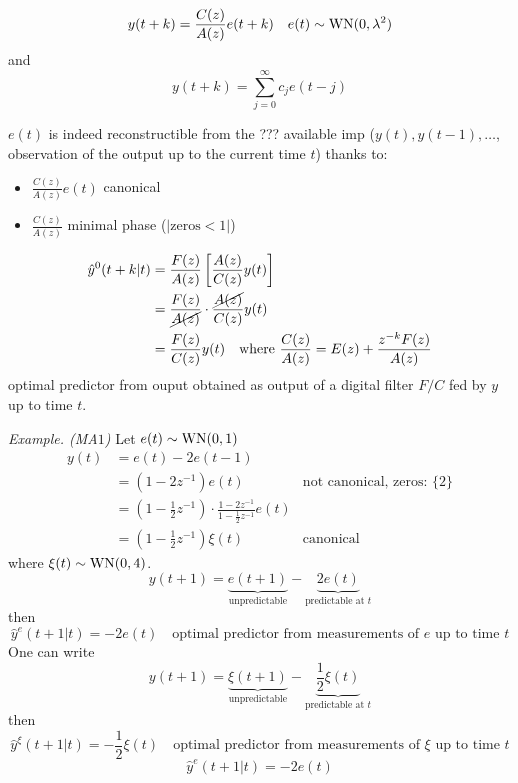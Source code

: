 

\[
	y(t+k)=\frac{C(z)}{A(z)}e(t+k) \quad e(t)\sim\operatorname{WN}(0,\lambda^2 )
\]
and
\[
	y(t+k)=\sum_{j=0}^{\infty} c_{j} e(t-j)
\]



$e(t)$ is indeed reconstructible from the ??? available imp ($y(t), y(t-1),\ldots$, observation of the output up to the current time $t$) thanks to:
\begin{itemize}
	\item $\frac{C(z)}{A(z)}e(t)$ canonical
	\item $\frac{C(z)}{A(z)}$ minimal phase ($|\text{zeros}<1|$)
\end{itemize}


\begin{align*}
	\hat y ^{0}(t+k|t)&=\frac{F(z)}{A(z)}\left[ \frac{A(z)}{C(z)}y(t) \right]  \\
	&=\frac{F(z)}{\cancel{A(z)}}\cdot\frac{\cancel{A(z)}}{C(z)}y(t)\\
	&=\frac{F(z)}{C(z)}y(t) \quad \text{where }\frac{C(z)}{A(z)}=E(z)+\frac{z^{-k}F(z) }{A(z)}
\end{align*}
optimal predictor from ouput obtained as output of a digital filter $F/C$ fed by $y$ up to time $t$.

\emph{Example. (MA$1$)}
Let $e(t)\sim \operatorname{WN}(0,1)$
\begin{align*}
	y(t) &= e(t) - 2 e(t-1)\\
	&= (1-2z^{-1} )e(t) &\text{not canonical, zeros: }\{2\}\\
	&=\left( 1-\frac{1}{2} z^{-1}  \right) \cdot\frac{1-2z^{-1}}{1-\frac{1}{2} z^{-1}} e(t)\\
	&=\left( 1-\frac{1}{2} z^{-1}  \right) \xi(t) &\text{canonical}
\end{align*}
where $\xi(t)\sim \operatorname{WN}(0,4)$.
\[
	y(t+1)=\underbrace{e(t+1)}_{\text{unpredictable}}-\underbrace{2e(t)}_{\text{predictable at }t}
\]
then
\[
	\hat y ^{e}(t+1|t)=-2e(t) \quad \text{optimal predictor from measurements of $e$ up to time $t$} 
\]
One can write
\[
	y(t+1)=\underbrace{\xi(t+1)}_{\text{unpredictable}}-\underbrace{\frac{1}{2} \xi(t)}_{\text{predictable at }t}
\]
then
\[
	\hat y^{\xi} (t+1|t)=-\frac{1}{2} \xi(t) \quad \text{optimal predictor from measurements of $\xi$ up to time $t$} 
\]
\[
	\hat y^{e}(t+1|t)=-2e(t) 
\]


